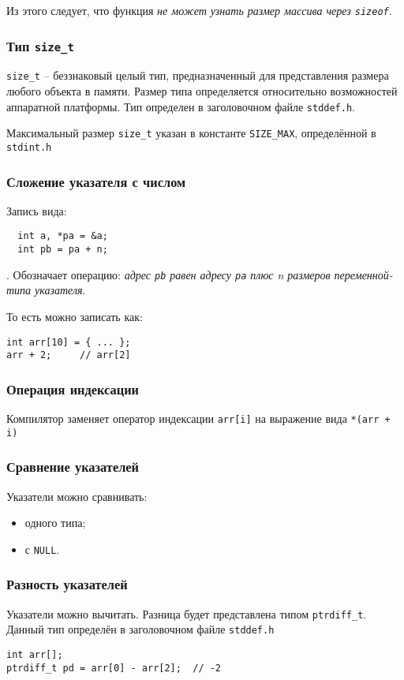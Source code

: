 Из этого следует, что функция \textit{не может узнать размер массива через \texttt{sizeof}}.

\subsubsection{Тип \texttt{size\_t}}

\texttt{size\_t} -- беззнаковый целый тип, предназначенный для представления размера любого объекта в памяти. Размер типа определяется относительно возможностей аппаратной платформы. Тип определен в заголовочном файле \texttt{stddef.h}.

Максимальный размер \texttt{size\_t} указан в константе \texttt{SIZE\_MAX}, определённой в \texttt{stdint.h}

\subsubsection{Сложение указателя с числом}

Запись вида:
\begin{verbatim}
  int a, *pa = &a;
  int pb = pa + n;
\end{verbatim}
.
Обозначает операцию: \textit{адрес \texttt{pb} равен адресу \texttt{pa} плюс n размеров переменной-типа указателя}.

То есть можно записать как:
\begin{verbatim}
int arr[10] = { ... };
arr + 2;     // arr[2]
\end{verbatim}

\subsubsection{Операция индексации}

Компилятор заменяет оператор индексации \texttt{arr[i]} на выражение вида \texttt{*(arr + i)}

\subsubsection{Сравнение указателей}

Указатели можно сравнивать:
\begin{itemize}
  \item одного типа;
  \item с \texttt{NULL}.
\end{itemize}

\subsubsection{Разность указателей}

Указатели можно вычитать. Разница будет представлена типом \texttt{ptrdiff\_t}. Данный тип определён в заголовочном файле \texttt{stddef.h}

\begin{verbatim}
int arr[];
ptrdiff_t pd = arr[0] - arr[2];  // -2
\end{verbatim}

